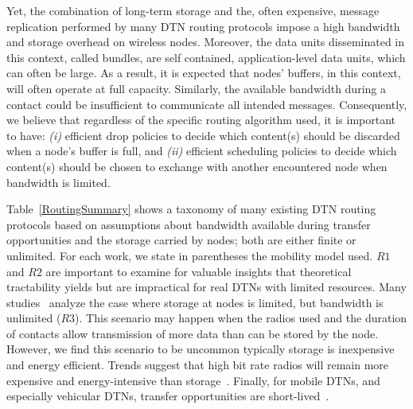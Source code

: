 Yet, the combination of long-term storage and the, often expensive, message replication performed by many DTN routing protocols impose a high bandwidth and storage overhead on wireless nodes. Moreover, the data units disseminated in this context, called bundles, are self contained, application-level data units, which can often be large. As a result, it is expected that nodes' buffers, in this context, will often operate at full capacity. Similarly, the available bandwidth during a contact could be insufficient to communicate all intended messages. Consequently, we believe that regardless of the specific routing algorithm used, it is important to have: \emph{(i)} efficient drop policies to decide which content(s) should be discarded when a node's buffer is full, and \emph{(ii)} efficient scheduling policies to decide which content(s) should be chosen to exchange with another encountered node when bandwidth is limited. 

Table~\ref{RoutingSummary} shows a taxonomy of many existing DTN routing protocols based on assumptions about bandwidth available during transfer opportunities and the storage
carried by nodes; both are either finite or unlimited. For each work, we state in parentheses the mobility model used. 
$R1$ and $R2$ are important to examine for valuable insights that theoretical tractability yields but are impractical for real DTNs with limited resources. Many studies~\cite{Lindgren:probabilistic,Wearable,MVRouting} analyze the case where storage at nodes is limited, but bandwidth is unlimited ($R3$). This scenario may happen when the radios used and the duration of contacts allow
transmission of more data than can be stored by the node. However, we find this scenario to be uncommon typically storage is inexpensive and energy efficient. Trends suggest that high bit rate radios will remain more expensive and energy-intensive than storage~\cite{PRESTO}. Finally, for mobile DTNs, and especially vehicular DTNs, transfer opportunities are short-lived~\cite{Levine:MaxProp}.

